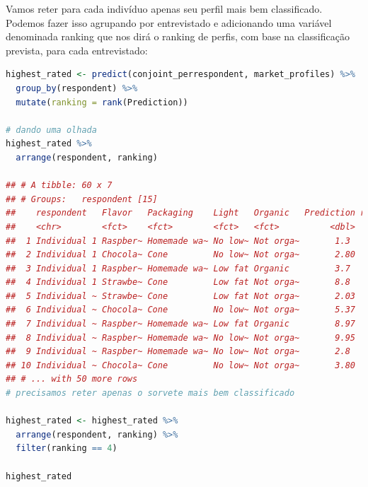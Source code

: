 \documentclass{article}
\begin{document}
Vamos reter para cada indivíduo apenas seu perfil mais bem classificado. Podemos fazer isso agrupando por entrevistado e adicionando uma variável denominada ranking que nos dirá o ranking de perfis, com base na classificação prevista, para cada entrevistado:

\begin{lstlisting}[language=R]
highest_rated <- predict(conjoint_perrespondent, market_profiles) %>% 
  group_by(respondent) %>% 
  mutate(ranking = rank(Prediction))

# dando uma olhada
highest_rated %>% 
  arrange(respondent, ranking)
  
## # A tibble: 60 x 7
## # Groups:   respondent [15]
##    respondent   Flavor   Packaging    Light   Organic   Prediction ranking
##    <chr>        <fct>    <fct>        <fct>   <fct>          <dbl>   <dbl>
##  1 Individual 1 Raspber~ Homemade wa~ No low~ Not orga~       1.3        1
##  2 Individual 1 Chocola~ Cone         No low~ Not orga~       2.80       2
##  3 Individual 1 Raspber~ Homemade wa~ Low fat Organic         3.7        3
##  4 Individual 1 Strawbe~ Cone         Low fat Not orga~       8.8        4
##  5 Individual ~ Strawbe~ Cone         Low fat Not orga~       2.03       1
##  6 Individual ~ Chocola~ Cone         No low~ Not orga~       5.37       2
##  7 Individual ~ Raspber~ Homemade wa~ Low fat Organic         8.97       3
##  8 Individual ~ Raspber~ Homemade wa~ No low~ Not orga~       9.95       4
##  9 Individual ~ Raspber~ Homemade wa~ No low~ Not orga~       2.8        1
## 10 Individual ~ Chocola~ Cone         No low~ Not orga~       3.80       2
## # ... with 50 more rows
# precisamos reter apenas o sorvete mais bem classificado

highest_rated <- highest_rated %>% 
  arrange(respondent, ranking) %>% 
  filter(ranking == 4)

highest_rated


\end{lstlisting}
\end{document}

